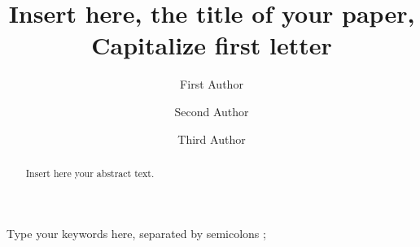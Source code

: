 \documentclass[5p,times,procedia]{elsarticle}
\begin{document}
\begin{frontmatter}



%

\title{Insert here, the title of your paper, Capitalize first letter}




\author[a]{First Author} 
\author[b]{Second Author}
\author[a,b]{Third Author}

\address[a]{First affiliation, Address, City and Postcode, Country}
\address[b]{Second affiliation, Address, City and Postcode, Country}


\begin{abstract}
Insert here your abstract text.
\end{abstract}

\begin{keyword}
Type your keywords here, separated by semicolons ; 




\end{keyword}

\end{frontmatter}
\end{document}
